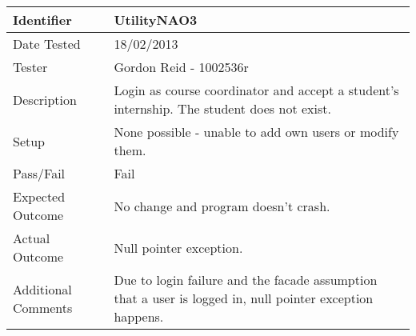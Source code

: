 \begin{tabularx}{\textwidth}{|T|L|}
\hline
Identifier & UtilityNAO3\\
\hline
Date Tested & 18/02/2013\\
\hline
Tester & Gordon Reid - 1002536r\\
\hline
Description & Login as course coordinator and accept a student's internship.
The student does not exist.\\
\hline
Setup & None possible - unable to add own users or modify them.\\
\hline
Pass/Fail & Fail\\
\hline
Expected Outcome & No change and program doesn't crash.\\
\hline
Actual Outcome & Null pointer exception.\\
\hline
Additional Comments & Due to login failure and the facade assumption that a
user is logged in, null pointer exception happens.\\
\hline
\end{tabularx}
